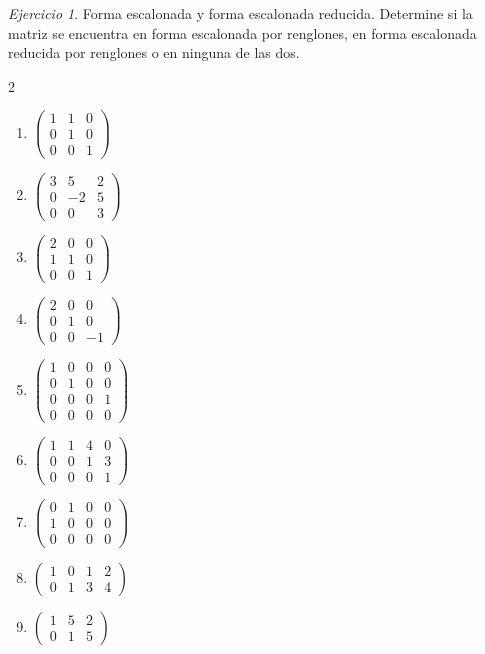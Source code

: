 \documentclass[12pt]{article}
\theoremstyle{remark}
\newtheorem{Ejer}[definicion]{Ejercicio}
\begin{document}
\begin{Ejer}
Forma escalonada y forma escalonada reducida. Determine si la matriz se encuentra en forma escalonada por renglones, en forma escalonada reducida por renglones o en ninguna de las dos.

\begin{multicols}{2}
\begin{enumerate}[resume]
\item $\begin{pmatrix}1&1&0\\0&1&0\\0&0&1\end{pmatrix}$
\item $\begin{pmatrix}3&5&2\\0&-2&5\\0&0&3\end{pmatrix}$
\item $\begin{pmatrix}2&0&0\\1&1&0\\0&0&1\end{pmatrix}$
\item $\begin{pmatrix}2&0&0\\0&1&0\\0&0&-1\end{pmatrix}$
\item $\begin{pmatrix}1&0&0&0\\0&1&0&0\\0&0&0&1\\0&0&0&0\end{pmatrix}$
\item $\begin{pmatrix}1&1&4&0\\0&0&1&3\\0&0&0&1\end{pmatrix}$
\item $\begin{pmatrix}0&1&0&0\\1&0&0&0\\0&0&0&0\end{pmatrix}$
\item $\begin{pmatrix}1&0&1&2\\0&1&3&4\end{pmatrix}$
\item $\begin{pmatrix}1&5&2\\0&1&5\end{pmatrix}$

\end{enumerate}
\end{multicols}
\end{Ejer}
\end{document}
